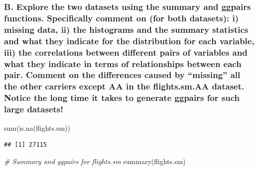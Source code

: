 \documentclass[
]{article}
\newenvironment{Shaded}{\begin{snugshade}}{\end{snugshade}}
\newcommand{\CommentTok}[1]{\textcolor[rgb]{0.56,0.35,0.01}{\textit{#1}}}
\newcommand{\FunctionTok}[1]{\textcolor[rgb]{0.00,0.00,0.00}{#1}}
\newcommand{\NormalTok}[1]{#1}
\begin{document}
\hypertarget{b.-explore-the-two-datasets-using-the-summary-and-ggpairs-functions.-specifically-comment-on-for-both-datasets-i-missing-data-ii-the-histograms-and-the-summary-statistics-and-what-they-indicate-for-the-distribution-for-each-variable-iii-the-correlations-between-different-pairs-of-variables-and-what-they-indicate-in-terms-of-relationships-between-each-pair.-comment-on-the-differences-caused-by-missing-all-the-other-carriers-except-aa-in-the-flights.sm.aa-dataset.-notice-the-long-time-it-takes-to-generate-ggpairs-for-such-large-datasets}{%
\subsubsection{B. Explore the two datasets using the summary and ggpairs
functions. Specifically comment on (for both datasets): i) missing data,
ii) the histograms and the summary statistics and what they indicate for
the distribution for each variable, iii) the correlations between
different pairs of variables and what they indicate in terms of
relationships between each pair. Comment on the differences caused by
``missing'' all the other carriers except AA in the flights.sm.AA
dataset. Notice the long time it takes to generate ggpairs for such
large
datasets!}\label{b.-explore-the-two-datasets-using-the-summary-and-ggpairs-functions.-specifically-comment-on-for-both-datasets-i-missing-data-ii-the-histograms-and-the-summary-statistics-and-what-they-indicate-for-the-distribution-for-each-variable-iii-the-correlations-between-different-pairs-of-variables-and-what-they-indicate-in-terms-of-relationships-between-each-pair.-comment-on-the-differences-caused-by-missing-all-the-other-carriers-except-aa-in-the-flights.sm.aa-dataset.-notice-the-long-time-it-takes-to-generate-ggpairs-for-such-large-datasets}}

\begin{Shaded}
\begin{Highlighting}[]
\FunctionTok{sum}\NormalTok{(}\FunctionTok{is.na}\NormalTok{(flights.sm))}
\end{Highlighting}
\end{Shaded}

\begin{verbatim}
## [1] 27115
\end{verbatim}

\begin{Shaded}
\begin{Highlighting}[]
\CommentTok{\# Summary and ggpairs for flights.sm}
\FunctionTok{summary}\NormalTok{(flights.sm)}
\end{Highlighting}
\end{Shaded}
\end{document}
